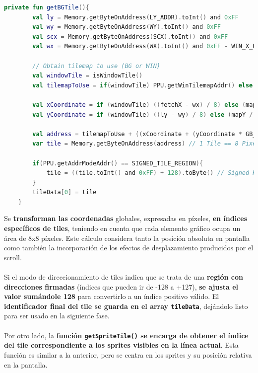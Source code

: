 \begin{lstlisting}[language=Kotlin, caption={FIFO Fetcher - Obtención de Tile de Background.}, label={code:ppufifogettilebg}]
    private fun getBGTile(){
        val ly = Memory.getByteOnAddress(LY_ADDR).toInt() and 0xFF
        val wy = Memory.getByteOnAddress(WY).toInt() and 0xFF
        val scx = Memory.getByteOnAddress(SCX).toInt() and 0xFF
        val wx = Memory.getByteOnAddress(WX).toInt() and 0xFF - WIN_X_OFFSET

        // Obtain tilemap to use (BG or WIN)
        val windowTile = isWindowTile()
        val tilemapToUse = if(windowTile) PPU.getWinTilemapAddr() else PPU.getBGTilemapAddr()

        val xCoordinate = if (windowTile) ((fetchX - wx) / 8) else (mapX / 8) and 0x1F
        val yCoordinate = if (windowTile) ((ly - wy) / 8) else (mapY / 8)

        val address = tilemapToUse + ((xCoordinate + (yCoordinate * GB_X_TOTAL_TILES)) and 0x3ff)
        var tile = Memory.getByteOnAddress(address) // 1 Tile == 8 Pixels

        if(PPU.getAddrModeAddr() == SIGNED_TILE_REGION){
            tile = ((tile.toInt() and 0xFF) + 128).toByte() // Signed Region [-128, 128] --> Transform to [0, 255]
        }
        tileData[0] = tile
    }
\end{lstlisting}

Se \textbf{transforman las coordenadas} globales, expresadas en píxeles, \textbf{en índices específicos de tiles}, teniendo en cuenta que cada elemento gráfico ocupa un área de 8x8 píxeles. Este cálculo considera tanto la posición absoluta en pantalla como también la incorporación de los efectos de desplazamiento producidos por el scroll.
\\\\
Si el modo de direccionamiento de tiles indica que se trata de una \textbf{región con direcciones firmadas} (índices que pueden ir de -128 a +127), \textbf{se ajusta el valor sumándole 128} para convertirlo a un índice positivo válido. El \textbf{identificador final del tile se guarda en el array \texttt{tileData}}, dejándolo listo para ser usado en la siguiente fase.
\\\\
Por otro lado, la \textbf{función \texttt{getSpriteTile()} se encarga de obtener el índice del tile correspondiente a los sprites visibles en la línea actual}. Esta función es similar a la anterior, pero se centra en los sprites y su posición relativa en la pantalla.

